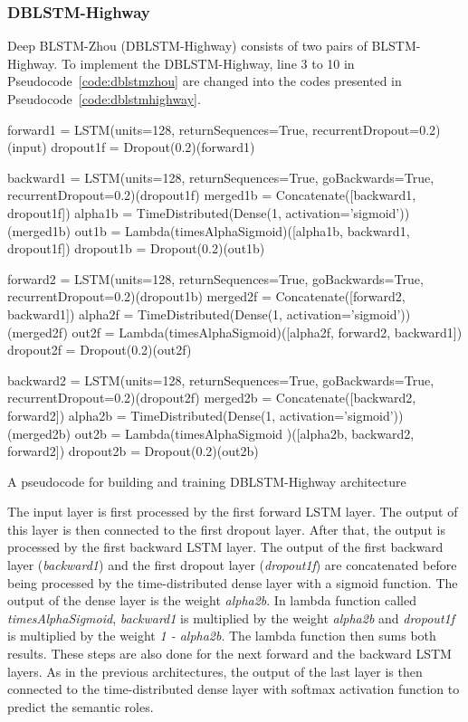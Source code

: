 \subsubsection{DBLSTM-Highway}
Deep BLSTM-Zhou (DBLSTM-Highway) consists of two pairs of BLSTM-Highway. To implement the DBLSTM-Highway, line 3 to 10 in Pseudocode~\ref{code:dblstmzhou} are changed into the codes presented in Pseudocode~\ref{code:dblstmhighway}.

\begin{kode}
		forward1 = LSTM(units=128, returnSequences=True, recurrentDropout=0.2)(input)\;
		dropout1f = Dropout(0.2)(forward1)\;
		\BlankLine
		
		backward1 = LSTM(units=128, returnSequences=True, goBackwards=True, recurrentDropout=0.2)(dropout1f)\;
		merged1b = Concatenate([backward1, dropout1f])\;
		alpha1b = TimeDistributed(Dense(1, activation='sigmoid'))(merged1b)\;
		out1b = Lambda(timesAlphaSigmoid)([alpha1b, backward1, dropout1f])\;
		dropout1b = Dropout(0.2)(out1b)\;
		\BlankLine
		
		forward2 = LSTM(units=128, returnSequences=True, goBackwards=True, recurrentDropout=0.2)(dropout1b)\;
		merged2f = Concatenate([forward2, backward1])\;
		alpha2f = TimeDistributed(Dense(1, activation='sigmoid'))(merged2f)\;
		out2f = Lambda(timesAlphaSigmoid)([alpha2f, forward2, backward1])\;
		dropout2f = Dropout(0.2)(out2f)\;
		\BlankLine
		
		backward2 = LSTM(units=128, returnSequences=True, goBackwards=True, recurrentDropout=0.2)(dropout2f)\;
		merged2b = Concatenate([backward2, forward2])\;
		alpha2b = TimeDistributed(Dense(1, activation='sigmoid'))(merged2b)\;
		out2b = Lambda(timesAlphaSigmoid
		)([alpha2b, backward2, forward2])\;
		dropout2b = Dropout(0.2)(out2b)\;
	
	\caption{A pseudocode for building and training DBLSTM-Highway architecture}
	\label{code:dblstmhighway}
\end{kode}

The input layer is first processed by the first forward LSTM layer. The output of this layer is then connected to the first dropout layer. After that, the output is processed by the first backward LSTM layer. The output of the first backward layer (\textit{backward1}) and the first dropout layer (\textit{dropout1f}) are concatenated before being processed by the time-distributed dense layer with a sigmoid function. The output of the dense layer is the weight \textit{alpha2b}. In lambda function called \textit{timesAlphaSigmoid}, \textit{backward1} is multiplied by the weight \textit{alpha2b} and \textit{dropout1f} is multiplied by the weight \textit{1 - alpha2b}. The lambda function then sums both results. These steps are also done for the next forward and the backward LSTM layers. As in the previous architectures, the output of the last layer is then connected to the time-distributed dense layer with softmax activation function to predict the semantic roles.

